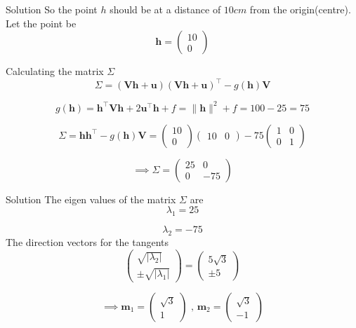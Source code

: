 \documentclass{beamer}
\let\vec\mathbf
\theoremstyle{remark}
\newcommand{\abs}[1]{\left|#1\right|}
\providecommand{\norm}[1]{\lVert#1\rVert}
\newcommand{\myvec}[1]{\ensuremath{\begin{pmatrix}#1\end{pmatrix}}}
\begin{document}
\begin{frame}{Solution}
So the point $h$ should be at a distance of $10cm$ from the origin(centre).
Let the point be
\begin{equation}
    \vec{h} = \myvec{10\\0}
\end{equation}

Calculating the matrix $\Sigma$
\begin{equation}
    \Sigma = (\vec{V}\vec{h} + \vec{u})(\vec{V}\vec{h} + \vec{u})^{\top} - g(\vec{h})\vec{V}
\end{equation}

\begin{equation}
    g(\vec{h}) = \vec{h}^{\top}\vec{V}\vec{h} + 2\vec{u}^{\top}\vec{h} + f = \norm{\vec{h}}^2 + f = 100 - 25 = 75
\end{equation}

\begin{equation}
    \Sigma = \vec{h}\vec{h}^{\top} - g(\vec{h})\vec{V} = \myvec{10\\0}\myvec{10&0} - 75\myvec{1&0\\0&1}
\end{equation}

\begin{equation}
    \implies \Sigma = \myvec{25&0\\0&-75}
\end{equation}
\end{frame}

\begin{frame}{Solution}
The eigen values of the matrix $\Sigma$ are 
\begin{equation}
    \lambda_1 = 25
\end{equation}

\begin{equation}
    \lambda_2 = -75
\end{equation}
The direction vectors for the tangents
\begin{equation}
    \myvec{\sqrt{\abs{\lambda_2}}\\ \pm \sqrt{\abs{\lambda_1}}} = \myvec{5\sqrt{3}\\ \pm 5}
\end{equation}

\begin{equation}
    \implies \vec{m}_1 = \myvec{\sqrt{3}\\1} \text{ , } \vec{m}_2 = \myvec{\sqrt{3}\\-1}
\end{equation}
\end{frame}
\end{document}
